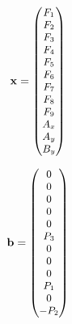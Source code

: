 \begin{gather}
\begin{small}
\mathbf{x} =
\begin{pmatrix}
F_1\\
F_2\\
F_3\\
F_4\\
F_5\\
F_6\\
F_7\\
F_8\\
F_9\\
A_x\\
A_y\\
B_y\\
\end{pmatrix}
\end{small}
\label{eqn:TrussX}
\end{gather}

\begin{gather}
\begin{small}
\mathbf{b} =
\begin{pmatrix}
0\\
0\\
0\\
0\\
0\\
P_3\\
0\\
0\\
0\\
P_1\\
0\\
-P_2\\
\end{pmatrix}
\end{small}
\label{eqn:TrussRHS}
\end{gather}

